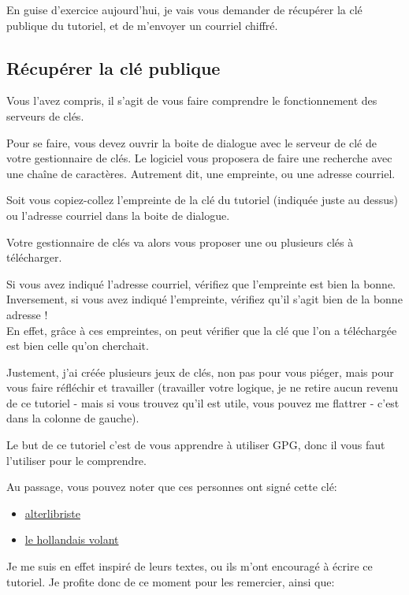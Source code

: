 En guise d'exercice aujourd'hui, je vais vous demander de récupérer la
clé publique du tutoriel, et de m'envoyer un courriel chiffré.

\subsection{Récupérer la clé
publique}\label{ruxe9cupuxe9rer-la-cluxe9-publique}

Vous l'avez compris, il s'agit de vous faire comprendre le
fonctionnement des serveurs de clés.

Pour se faire, vous devez ouvrir la boite de dialogue avec le serveur de
clé de votre gestionnaire de clés. Le logiciel vous proposera de faire
une recherche avec une chaîne de caractères. Autrement dit, une
empreinte, ou une adresse courriel.

Soit vous copiez-collez l'empreinte de la clé du tutoriel (indiquée
juste au dessus) ou l'adresse courriel dans la boite de dialogue.

Votre gestionnaire de clés va alors vous proposer une ou plusieurs clés
à télécharger.

Si vous avez indiqué l'adresse courriel, vérifiez que l'empreinte est
bien la bonne.\\Inversement, si vous avez indiqué l'empreinte, vérifiez
qu'il s'agit bien de la bonne adresse !\\En effet, grâce à ces
empreintes, on peut vérifier que la clé que l'on a téléchargée est bien
celle qu'on cherchait.

Justement, j'ai créée plusieurs jeux de clés, non pas pour vous piéger,
mais pour vous faire réfléchir et travailler (travailler votre logique,
je ne retire aucun revenu de ce tutoriel - mais si vous trouvez qu'il
est utile, vous pouvez me flattrer - c'est dans la colonne de gauche).

Le but de ce tutoriel c'est de vous apprendre à utiliser GPG, donc il
vous faut l'utiliser pour le comprendre.

Au passage, vous pouvez noter que ces personnes ont signé cette clé:

\begin{itemize}
\itemsep1pt\parskip0pt
\item
  \href{http://alterlibriste.free.fr/}{alterlibriste}
\item
  \href{http://lehollandaisvolant.net/}{le hollandais volant}
\end{itemize}

Je me suis en effet inspiré de leurs textes, ou ils m'ont encouragé à
écrire ce tutoriel. Je profite donc de ce moment pour les remercier,
ainsi que:

